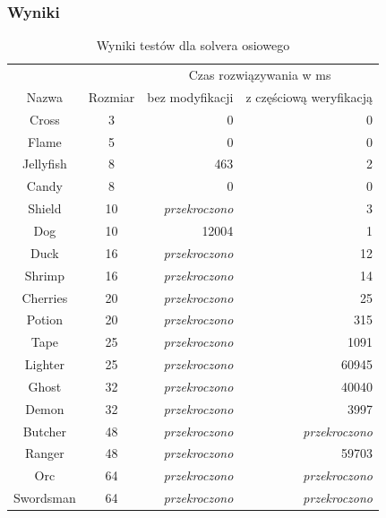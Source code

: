 \subsubsection{Wyniki}
\begin{table}[h!]
    \begin{center}
        \begin{tabular}{|c|c|r r|}
            \hline
            {}          & {}        & \multicolumn{2}{c|}{Czas rozwiązywania w ms} \\
            Nazwa       & Rozmiar   & bez modyfikacji & z częściową weryfikacją \\
            \hline
            Cross       & 3         & 0                     & 0 \\
            Flame       & 5         & 0                     & 0 \\
            Jellyfish   & 8         & 463                   & 2 \\
            Candy       & 8         & 0                     & 0 \\
            Shield      & 10        & \textit{przekroczono} & 3 \\
            Dog         & 10        & 12004                 & 1 \\
            Duck        & 16        & \textit{przekroczono} & 12 \\
            Shrimp      & 16        & \textit{przekroczono} & 14 \\
            Cherries    & 20        & \textit{przekroczono} & 25 \\
            Potion      & 20        & \textit{przekroczono} & 315 \\
            Tape        & 25        & \textit{przekroczono} & 1091 \\
            Lighter     & 25        & \textit{przekroczono} & 60945 \\
            \hline
            Ghost       & 32        & \textit{przekroczono} & 40040 \\
            Demon       & 32        & \textit{przekroczono} & 3997 \\
            Butcher     & 48        & \textit{przekroczono} & \textit{przekroczono} \\
            Ranger      & 48        & \textit{przekroczono} & 59703 \\
            Orc         & 64        & \textit{przekroczono} & \textit{przekroczono} \\
            Swordsman   & 64        & \textit{przekroczono} & \textit{przekroczono} \\
            \hline
        \end{tabular}
    \end{center}
    \caption{Wyniki testów dla solvera osiowego}
\end{table}

